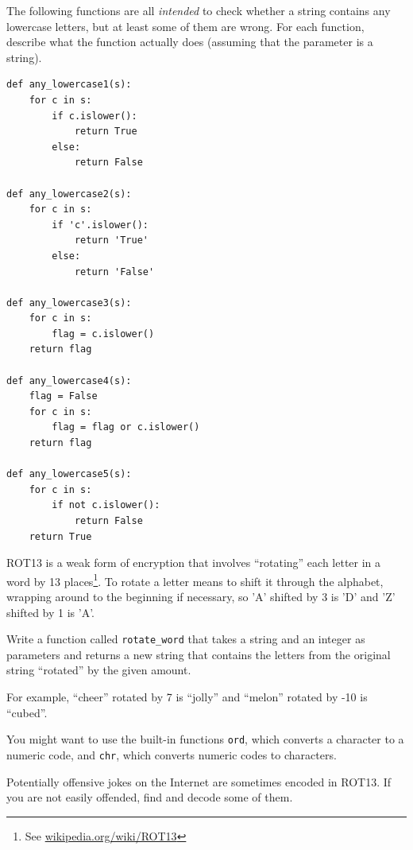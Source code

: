 \documentclass[10pt]{book}
\begin{document}
\begin{ex}
The following functions are all {\em intended} to check whether a
string contains any lowercase letters, but at least some of them are
wrong.  For each function, describe what the function actually does
(assuming that the parameter is a string).

\beforeverb
\begin{verbatim}
def any_lowercase1(s):
    for c in s:
        if c.islower():
            return True
        else:
            return False

def any_lowercase2(s):
    for c in s:
        if 'c'.islower():
            return 'True'
        else:
            return 'False'

def any_lowercase3(s):
    for c in s:
        flag = c.islower()
    return flag

def any_lowercase4(s):
    flag = False
    for c in s:
        flag = flag or c.islower()
    return flag

def any_lowercase5(s):
    for c in s:
        if not c.islower():
            return False
    return True
\end{verbatim}
\afterverb

\end{ex}


\begin{ex}

\label{exrotate}
ROT13 is a weak form of encryption that involves ``rotating'' each
letter in a word by 13 places\footnote{See
  \url{wikipedia.org/wiki/ROT13}}.  To rotate a letter means
to shift it through the alphabet, wrapping around to the beginning if
necessary, so 'A' shifted by 3 is 'D' and 'Z' shifted by 1 is 'A'.

Write a function called \verb"rotate_word"
that takes a string and an integer as parameters and returns
a new string that contains the letters from the original string
``rotated'' by the given amount.  

For example, ``cheer'' rotated by 7 is ``jolly'' and ``melon'' rotated
by -10 is ``cubed''.  


You might want to use the built-in functions {\tt ord}, which converts
a character to a numeric code, and {\tt chr}, which converts numeric
codes to characters.

Potentially offensive jokes on the Internet are sometimes encoded
in ROT13.  If you are not easily offended, find and decode some
of them.
\end{ex}
\end{document}
